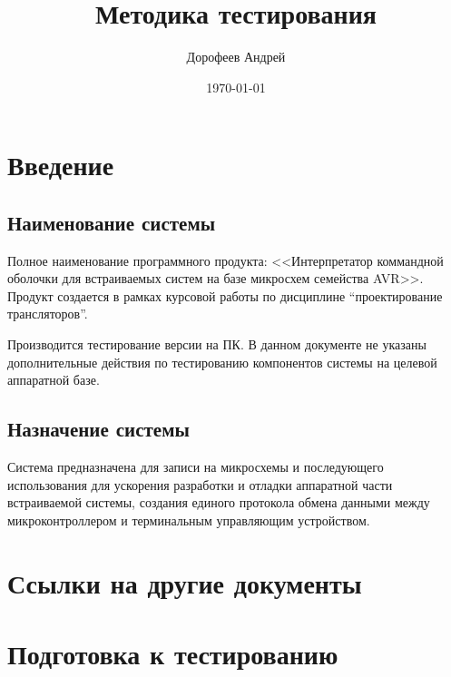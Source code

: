\documentclass[a4paper, 12pt]{article}
\begin{document}
\author{Дорофеев Андрей}
\title{Методика тестирования}
\date{\today}
\maketitle

\tableofcontents

\section{Введение}

\subsection{Наименование системы} %

Полное наименование программного продукта: <<Интерпретатор коммандной оболочки для встраиваемых систем на базе 
микросхем семейства AVR>>. Продукт создается в рамках курсовой работы по дисциплине ``проектирование трансляторов''.

Производится тестирование версии на ПК. В данном документе не указаны 
дополнительные действия по тестированию компонентов системы на целевой аппаратной базе.


\subsection{Назначение системы} %

Система предназначена для записи на микросхемы и последующего использования
для ускорения разработки и отладки аппаратной части встраиваемой системы, создания 
единого протокола обмена данными между микроконтроллером и терминальным управляющим
устройством.



\section{Ссылки на другие документы}


\section{Подготовка к тестированию}
\end{document}
